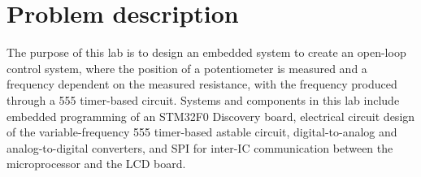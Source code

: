 
\section{Problem description}
The purpose of this lab is to design an embedded system to create an
open-loop control system, where the position of a potentiometer is
measured and a frequency dependent on the measured resistance, with the
frequency produced through a 555 timer-based circuit. Systems and
components in this lab include embedded programming of an STM32F0
Discovery board, electrical circuit design of the variable-frequency 555
timer-based astable circuit, digital-to-analog and analog-to-digital
converters, and SPI for inter-IC communication between the
microprocessor and the LCD board.
